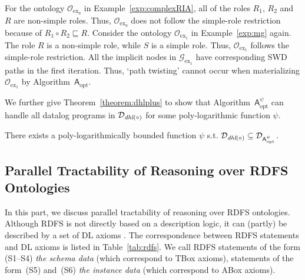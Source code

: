 \begin{example}
For the ontology $\mathcal{O}_{\text{ex}_9}$ in Example~\ref{exp:complexRIA}, all of the roles
$R_1$, $R_2$ and $R$ are non-simple roles. Thus, $\mathcal{O}_{\text{ex}_9}$ does not follow
the simple-role restriction because of $R_1\circ R_2\sqsubseteq R$.
Consider the ontology $\mathcal{O}_{\text{ex}_1}$
in Example~\ref{exp:mg} again. The role $R$ is a non-simple role, while $S$ is a simple role.
Thus, $\mathcal{O}_{\text{ex}_1}$ follows the simple-role restriction. All the implicit nodes
in $\mathcal{G}_{\text{ex}_1}$ have corresponding SWD paths in the first iteration.
Thus, `path twisting' cannot occur when materializing $\mathcal{O}_{\text{ex}_1}$ by Algorithm~$\mathsf{A}_{\text{opt}}$.
\end{example}

We further give Theorem~\ref{theorem:dhlplus} to show that Algorithm~$\mathsf{A}_{\text{opt}}^{\psi}$ can handle
all datalog programs in $\mathcal{D}_{\textit{\text{dhl}}(\circ)}$ for some poly-logarithmic function $\psi$.

\begin{theorem}\label{theorem:dhlplus}
There exists a poly-logarithmically bounded function $\psi$ s.t. $\mathcal{D}_{\textit{\text{dhl}}(\circ)}\subseteq\mathcal{D}_{\mathsf{A}_{\text{opt}}^{\psi}}$.
\end{theorem}

\subsection{Parallel Tractability of Reasoning over RDFS Ontologies}

In this part, we discuss parallel tractability of reasoning over RDFS ontologies.
Although RDFS is not directly based on a description logic, it can (partly) be described by a set of DL axioms \cite{GrosofHVD03}.
The correspondence between RDFS statements and DL axioms is listed in Table~\ref{tab:rdfs}.
We call RDFS statements of the form (S1--S4) \emph{the schema data}
(which correspond to TBox axioms), statements of the form~(S5) and~(S6)
\emph{the instance data} (which correspond to ABox axioms).

